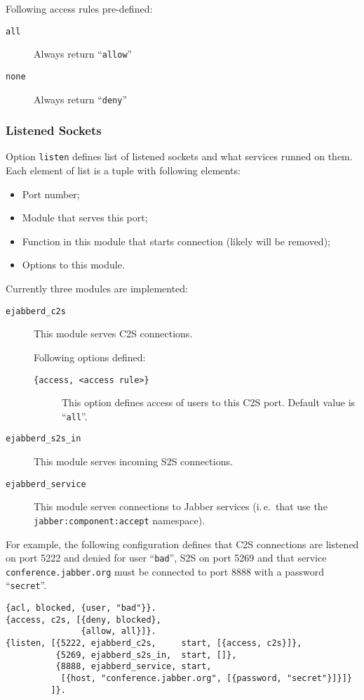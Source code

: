 \documentclass[10pt]{article}
\newcommand{\Jabber}{Jabber}
\begin{document}
Following access rules pre-defined:
\begin{description}
\item[\texttt{all}] Always return ``\texttt{allow}''
\item[\texttt{none}] Always return ``\texttt{deny}''
\end{description}


\subsubsection{Listened Sockets}
\label{sec:configlistened}

Option \texttt{listen} defines list of listened sockets and what services
runned on them.  Each element of list is a tuple with following elements:
\begin{itemize}
\item Port number;
\item Module that serves this port;
\item Function in this module that starts connection (likely will be removed);
\item Options to this module.
\end{itemize}

Currently three modules are implemented:
\begin{description}
\item[\texttt{ejabberd\_c2s}] This module serves C2S connections.
  
  Following options defined:
  \begin{description}
  \item[\texttt{\{access, <access rule>\}}] This option defines access of users
    to this C2S port.  Default value is ``\texttt{all}''.
  \end{description}
\item[\texttt{ejabberd\_s2s\_in}] This module serves incoming S2S connections.
\item[\texttt{ejabberd\_service}] This module serves connections to \Jabber{}
  services (i.\,e.\ that use the \texttt{jabber:component:accept} namespace).
\end{description}

For example, the following configuration defines that C2S connections are
listened on port 5222 and denied for user ``\texttt{bad}'', S2S on port 5269
and that service \texttt{conference.jabber.org} must be connected to port 8888
with a password ``\texttt{secret}''.

\begin{verbatim}
{acl, blocked, {user, "bad"}}.
{access, c2s, [{deny, blocked},
               {allow, all}]}.
{listen, [{5222, ejabberd_c2s,     start, [{access, c2s}]},
          {5269, ejabberd_s2s_in,  start, []},
          {8888, ejabberd_service, start,
           [{host, "conference.jabber.org", [{password, "secret"}]}]}
         ]}.
\end{verbatim}
\end{document}
